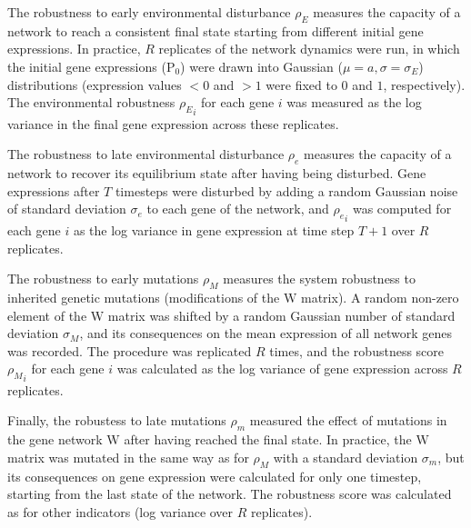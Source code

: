 \documentclass[10pt,a4paper]{article}
\newcommand{\earlyenv}{{\rho_E}}
\newcommand{\lateenv}{{\rho_e}}
\newcommand{\earlymut}{{\rho_M}}
\newcommand{\latemut}{{\rho_m}}
\newcommand{\W}{\bm{\mathrm W}}
\newcommand{\Pp}{\bm{\mathrm P}}
\begin{document}
The robustness to early environmental disturbance $\earlyenv$ measures the capacity of a network to reach a consistent final state starting from different initial gene expressions. In practice, $R$ replicates of the network dynamics were run, in which the initial gene expressions ($\Pp_0$) were drawn into Gaussian ($\mu = a, \sigma = \sigma_E$) distributions (expression values $<0$ and $>1$ were fixed to $0$ and $1$, respectively). The environmental robustness $\earlyenv_i$ for each gene $i$ was measured as the log variance in the final gene expression across these replicates. 

The robustness to late environmental disturbance $\lateenv$ measures the capacity of a network to recover its equilibrium state after having being disturbed. Gene expressions after $T$ timesteps were disturbed by adding a random Gaussian noise of standard deviation $\sigma_e$ to each gene of the network, and $\lateenv_i$ was computed for each gene $i$ as the log variance in gene expression at time step $T+1$ over $R$ replicates. 

The robustness to early mutations $\earlymut$ measures the system robustness to inherited genetic mutations (modifications of the $\W$ matrix). A random non-zero element of the $\W$ matrix was shifted by a random Gaussian number of standard deviation $\sigma_M$, and its consequences on the mean expression of all network genes was recorded. The procedure was replicated $R$ times, and the robustness score $\earlymut_i$ for each gene $i$ was calculated as the log variance of gene expression across $R$ replicates. 

Finally, the robustess to late mutations $\latemut$ measured the effect of mutations in the gene network $\W$ after having reached the final state. In practice, the $\W$ matrix was mutated in the same way as for $\earlymut$ with a standard deviation $\sigma_m$, but its consequences on gene expression were calculated for only one timestep, starting from the last state of the network. The robustness score was calculated as for other indicators (log variance over $R$ replicates).
\end{document}
